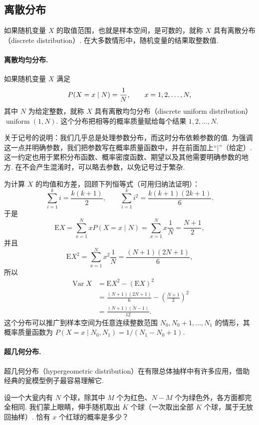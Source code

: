 \subsection{离散分布}\label{sec:3.2}
如果随机变量 $X$ 的取值范围，也就是样本空间，是可数的，就称 $X$ 具有离散分布（discrete distribution）. 在大多数情形中，随机变量的结果取整数值.

\paragraph{离散均匀分布.}
如果随机变量 $X$ 满足
\begin{equation}\label{eq:3.2.1}\index{SI0287@离散均匀}
P(X=x\mid N)=\frac1N,\qquad x=1,2,\ldots,N,
\end{equation}
其中 $N$ 为给定整数，就称 $X$ 具有离散均匀分布（discrete uniform distribution）$\operatorname{uniform}(1,N)$. 这个分布把相等的概率质量赋给每个结果 $1,2,\ldots,N$.

关于记号的说明：我们几乎总是处理参数分布，而这时分布依赖参数的值. 为强调这一点并明确参数，我们把参数写在概率质量函数中，并在前面加上“$\mid$”（给定）. 这一约定也用于累积分布函数、概率密度函数、期望以及其他需要明确参数的地方. 在不会产生混淆时，可以略去参数，以免记号过于繁杂.

为计算 $X$ 的均值和方差，回顾下列恒等式（可用归纳法证明）：
$$\sum_{i=1}^k i=\frac{k(k+1)}2,\qquad
\sum_{i=1}^k i^2=\frac{k(k+1)(2k+1)}6.$$
于是
$$\mathrm EX=\sum_{x=1}^N xP(X=x\mid N)=\sum_{x=1}^N x\frac1N=\frac{N+1}2,$$
并且
$$\mathrm EX^2=\sum_{x=1}^N x^2\frac1N=\frac{(N+1)(2N+1)}6,$$
所以
$$\begin{aligned}
\operatorname{Var}X&=\mathrm EX^2-(\mathrm EX)^2\\
&=\frac{(N+1)(2N+1)}6-\left(\frac{N+1}2\right)^2\\
&=\frac{(N+1)(N-1)}{12}.
\end{aligned}$$
这个分布可以推广到样本空间为任意连续整数范围 $N_0,N_0+1,\ldots,N_1$ 的情形，其概率质量函数为 $P(X=x\mid N_0,N_1)=1/(N_1-N_0+1)$.

\paragraph{超几何分布.}
超几何分布（hypergeometric distribution）在有限总体抽样中有许多应用，借助经典的瓮模型例子最容易理解它.

设一个大瓮内有 $N$ 个球，除其中 $M$ 个为红色、$N-M$ 个为绿色外，各方面都完全相同. 我们蒙上眼睛，伸手随机取出 $K$ 个球（一次取出全部 $K$ 个球，属于无放回抽样）. 恰有 $x$ 个红球的概率是多少？

